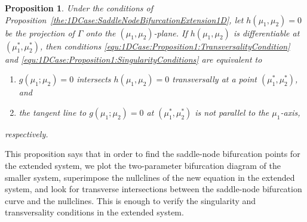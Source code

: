 \documentclass[12pt]{article}
\newtheorem{proposition}{Proposition}
\begin{document}
\begin{proposition}
    \label{the:1DCase:SaddleNodeBifurcationExtension1DCorollary}
    Under the conditions of Proposition~\eqref{the:1DCase:SaddleNodeBifurcationExtension1D}, let $h(\mu_{1},\mu_{2})=0$ be the projection of $\Gamma$ onto the $(\mu_{1},\mu_{2})$-plane. If $h(\mu_{1},\mu_{2})$ is differentiable at $(\mu_{1}^{*},\mu_{2}^{*})$, then conditions \eqref{equ:1DCase:Proposition1:TransversalityCondition} and \eqref{equ:1DCase:Proposition1:SingularityConditions} are equivalent to
    \begin{enumerate}
        \item $g(\mu_{1};\mu_{2})=0$ intersects $h(\mu_{1},\mu_{2})=0$ transversally at a point $(\mu_{1}^{*},\mu_{2}^{*})$, and
        \item the tangent line to $g(\mu_{1};\mu_{2})=0$ at $(\mu_{1}^{*},\mu_{2}^{*})$ is not parallel to the $\mu_{1}$-axis,
    \end{enumerate}
    respectively.
\end{proposition}


This proposition says that in order to find the saddle-node bifurcation points for the extended system, we plot the two-parameter bifurcation diagram of the smaller system, superimpose the nullclines of the new equation in the extended system, and look for transverse intersections between the saddle-node bifurcation curve and the nullclines. This is enough to verify the singularity and transversality conditions in the extended system.
\end{document}
